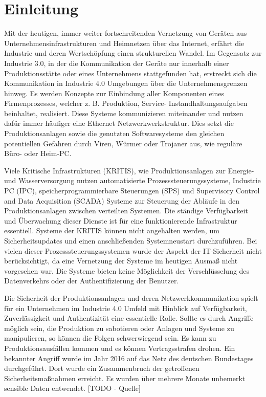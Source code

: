 \chapter{Einleitung}
Mit der heutigen, immer weiter fortschreitenden Vernetzung von Geräten aus Unternehmensinfrastrukturen und Heimnetzen über das Internet, erfährt die Industrie und deren Wertschöpfung einen strukturellen Wandel. Im Gegensatz zur Industrie 3.0, in der die Kommunikation der Geräte nur innerhalb einer Produktionsstätte oder eines Unternehmens stattgefunden hat, erstreckt sich die Kommunikation in Industrie 4.0 Umgebungen über die Unternehmensgrenzen hinweg. Es werden Konzepte zur Einbindung aller Komponenten eines Firmenprozesses, welcher z. B. Produktion, Service- Instandhaltungsaufgaben beinhaltet, realisiert. Diese Systeme kommunizieren miteinander und nutzen dafür immer häufiger eine Ethernet Netzwerkwerkstruktur. Dies setzt die Produktionsanlagen sowie die genutzten Softwaresysteme den gleichen potentiellen Gefahren durch Viren, Würmer oder Trojaner aus, wie reguläre Büro- oder Heim-PC.

Viele Kritische Infrastrukturen (KRITIS), wie Produktionsanlagen zur Energie- und Wasserversorgung nutzen automatisierte Prozesssteuerungssysteme, Industrie PC (IPC), speicherprogrammierbare Steuerungen (SPS) und Supervisory Control and Data Acquisition (SCADA) Systeme zur Steuerung der Abläufe in den Produktionsanlagen zwischen verteilten Systemen. Die ständige Verfügbarkeit und Überwachung dieser Dienste ist für eine funktionierende Infrastruktur essentiell. Systeme der KRITIS können nicht angehalten werden, um Sicherheitsupdates und einen anschließenden Systemneustart durchzuführen. Bei vielen dieser Prozesssteuerungssystemen wurde der Aspekt der IT-Sicherheit nicht berücksichtigt, da eine Vernetzung der Systeme im heutigen Ausmaß nicht vorgesehen war. Die Systeme bieten keine Möglichkeit der Verschlüsselung des Datenverkehrs oder der Authentifizierung der Benutzer.

Die Sicherheit der Produktionsanlagen und deren Netzwerkkommunikation spielt für ein Unternehmen im Industrie 4.0 Umfeld mit Hinblick auf Verfügbarkeit, Zuverlässigkeit und Authentizität eine essentielle Rolle. Sollte es durch Angriffe möglich sein, die Produktion zu sabotieren oder Anlagen und Systeme zu manipulieren, so können die Folgen schwerwiegend sein. Es kann zu Produktionsausfällen kommen und es können Vertragsstrafen drohen.
Ein bekannter Angriff wurde im Jahr 2016 auf das Netz des deutschen Bundestages durchgeführt. Dort wurde ein Zusammenbruch der getroffenen Sicherheitsmaßnahmen erreicht. Es wurden über mehrere Monate unbemerkt sensible Daten entwendet. [TODO - Quelle]

